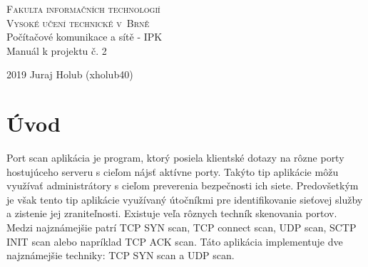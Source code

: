 \documentclass[a4paper, 11pt]{article}
\begin{document}
\begin{titlepage}
	\begin{center}
		\Huge
		\textsc{Fakulta informačních technologií \\
			Vysoké učení technické v~Brně} \\
		{\LARGE
			Počítačové komunikace a sítě - IPK \\ 
			\medskip \Large{Manuál k projektu č. 2}
			}
	\end{center}
		\setlength{\parindent}{0.3em}
		{\Large 2019 \hfill
			Juraj Holub (xholub40)}
\end{titlepage}

\tableofcontents
\newpage

\section{Úvod}
Port scan aplikácia je program, ktorý posiela klientské dotazy na rôzne porty hostujúceho serveru s cieľom nájsť aktívne porty. Takýto tip aplikácie môžu využívať administrátory s cieľom preverenia bezpečnosti ich siete. Predovšetkým je však tento tip aplikácie využívaný útočníkmi pre identifikovanie sieťovej služby a zistenie jej zraniteľnosti. Existuje veľa rôznych techník skenovania portov. Medzi najznámejšie patrí TCP SYN scan, TCP connect scan, UDP scan, SCTP INIT scan alebo napríklad TCP ACK scan. Táto aplikácia implementuje dve najznámejšie techniky: TCP SYN scan a UDP scan.
\cite{rfc_2828}
\end{document}
